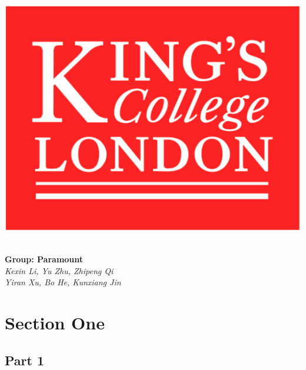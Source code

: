 \documentclass{article}
\begin{document}
	
	\begin{titlepage}
			\includegraphics*[scale=0.5]{cover.png}
			\begin{center}
				\vspace{5cm}
				 \\[8mm]
				\huge\textbf{Group: Paramount} \\[5mm]
				\large\emph{Kexin Li, Yu Zhu, Zhipeng Qi} \\[5mm]
				\large\emph{Yiran Xu, Bo He, Kunxiang Jin} \\[5mm]
			\end{center}
	\end{titlepage}



	
	\fontsize{11 pt}{0}
	
	\section{Section One}
	
	\subsection{Part 1}
	
\end{document}

